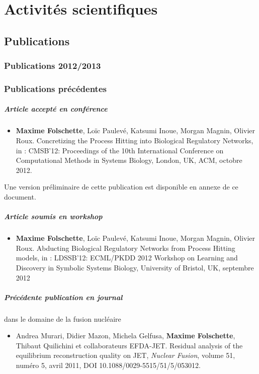 \chapter{Activités scientifiques}

\section{Publications}\label{sec:publications}

\subsection{Publications 2012/2013}


\subsection{Publications précédentes}\label{ssec:publications}

\paragraph{Article accepté en conférence}
\begin{itemize}
\item[] \textbf{Maxime Folschette}, Loïc Paulevé, Katsumi Inoue, Morgan Magnin, Olivier Roux.
Concretizing the Process Hitting into Biological Regulatory Networks,
in : CMSB'12\!\!: Proceedings of the 10th International Conference on Computational Methods in Systems Biology,
London, UK, ACM, octobre 2012.
\end{itemize}
Une version préliminaire de cette publication est disponible en annexe de ce document.

\paragraph{Article soumis en workshop}
\begin{itemize}
\item[] \textbf{Maxime Folschette}, Loïc Paulevé, Katsumi Inoue, Morgan Magnin, Olivier Roux.
Abducting Biological Regulatory Networks from Process Hitting models,
in : LDSSB'12\!\!: ECML/PKDD 2012 Workshop on Learning and Discovery in Symbolic Systems Biology,
University of Bristol, UK, septembre 2012
\end{itemize}

\paragraph{Précédente publication en journal} dans le domaine de la fusion nucléaire
\begin{itemize}
\item[] Andrea Murari, Didier Mazon, Michela Gelfusa, \textbf{Maxime Folschette}, Thibaut Quilichini et collaborateurs EFDA-JET.
Residual analysis of the equilibrium reconstruction quality on JET, \textit{Nuclear Fusion},
volume 51, numéro 5, avril 2011, DOI 10.1088/0029-5515/51/5/053012.
\end{itemize}



